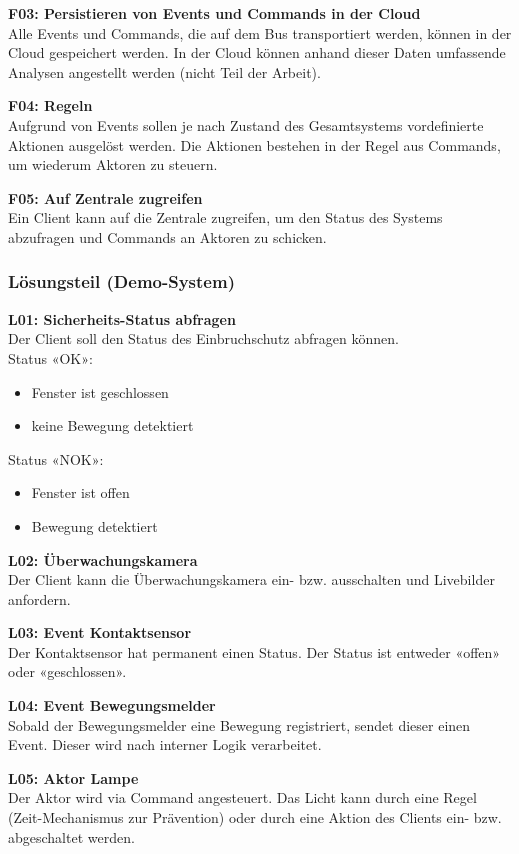 \textbf{F03: Persistieren von Events und Commands in der Cloud} \\
Alle Events und Commands, die auf dem Bus transportiert werden, können in der Cloud gespeichert werden. In der Cloud können anhand dieser Daten umfassende Analysen angestellt werden (nicht Teil der Arbeit).

\textbf{F04: Regeln} \\
Aufgrund von Events sollen je nach Zustand des Gesamtsystems vordefinierte Aktionen ausgelöst werden. Die Aktionen bestehen in der Regel aus Commands, um wiederum Aktoren zu steuern.

\textbf{F05: Auf Zentrale zugreifen} \\
Ein Client kann auf die Zentrale zugreifen, um den Status des Systems abzufragen und Commands an Aktoren zu schicken.

\subsubsection{Lösungsteil (Demo-System)}
\label{sec:requirementsSolutionPart}

\textbf{L01: Sicherheits-Status abfragen} \\
Der Client soll den Status des Einbruchschutz abfragen können. \\
Status «OK»:
\begin{itemize}
	\item Fenster ist geschlossen
	\item keine Bewegung detektiert
\end{itemize}
Status «NOK»:
\begin{itemize}
	\item Fenster ist offen
	\item Bewegung detektiert
\end{itemize}

\textbf{L02: Überwachungskamera} \\
Der Client kann die Überwachungskamera ein- bzw. ausschalten und Livebilder anfordern.

\textbf{L03: Event Kontaktsensor} \\
Der Kontaktsensor hat permanent einen Status. Der Status ist entweder «offen» oder «geschlossen».

\textbf{L04: Event Bewegungsmelder} \\
Sobald der Bewegungsmelder eine Bewegung registriert, sendet dieser einen Event. Dieser wird nach interner Logik verarbeitet.

\textbf{L05: Aktor Lampe} \\
Der Aktor wird via Command angesteuert. Das Licht kann durch eine Regel (Zeit-Mechanismus zur Prävention) oder durch eine Aktion des Clients ein- bzw. abgeschaltet werden.

